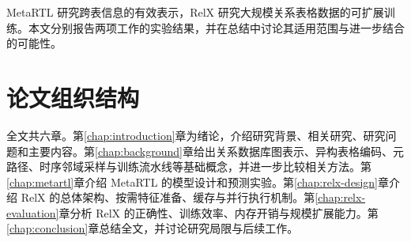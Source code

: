 MetaRTL 研究跨表信息的有效表示，RelX 研究大规模关系表格数据的可扩展训练。本文分别报告两项工作的实验结果，并在总结中讨论其适用范围与进一步结合的可能性。

\section{论文组织结构}

全文共六章。第\ref{chap:introduction}章为绪论，介绍研究背景、相关研究、研究问题和主要内容。第\ref{chap:background}章给出关系数据库图表示、异构表格编码、元路径、时序邻域采样与训练流水线等基础概念，并进一步比较相关方法。第\ref{chap:metartl}章介绍 MetaRTL 的模型设计和预测实验。第\ref{chap:relx-design}章介绍 RelX 的总体架构、按需特征准备、缓存与并行执行机制。第\ref{chap:relx-evaluation}章分析 RelX 的正确性、训练效率、内存开销与规模扩展能力。第\ref{chap:conclusion}章总结全文，并讨论研究局限与后续工作。
